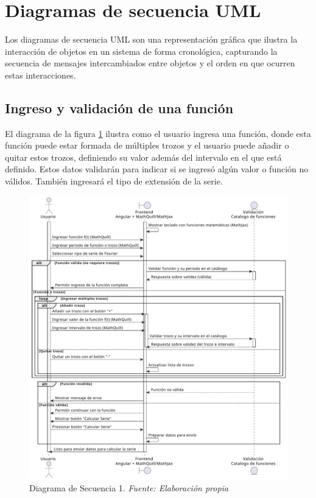 \newpage

\section{Diagramas de secuencia UML}
Los diagramas de secuencia UML son una representación gráfica que ilustra la interacción de objetos en un sistema de forma cronológica, capturando la secuencia de mensajes intercambiados entre objetos y el orden en que ocurren estas interacciones.


\subsection{Ingreso y validación de una función}
El diagrama de  la figura \ref{fig:Diagrama_secuencia_1} ilustra como el usuario ingresa una función, donde esta función puede estar formada de múltiples trozos y el usuario puede añadir o quitar estos trozos, definiendo su valor además del intervalo en el que está definido. Estos datos validarán para indicar si se ingresó algún valor o función no válidos. También ingresará el tipo de extensión de la serie.
\begin{figure}[H]
	\centering
	\includegraphics[width=1\textwidth]{img/chapter04/DS1.pdf}
	\caption[Diagrama de Secuencia 1.]{Diagrama de Secuencia 1. \textit{Fuente: \textit{Elaboración propia}}}
	\label{fig:Diagrama_secuencia_1}
\end{figure}


